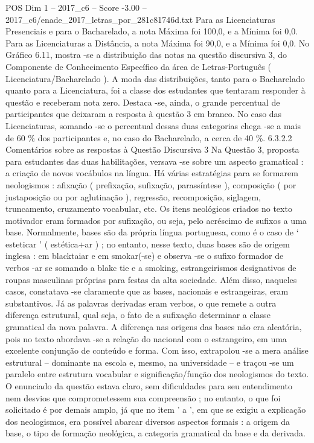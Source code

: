 \begin{textsample}{POS Dim 1 – 2017\_c6 – Score -3.00 – 2017\_c6/enade\_2017\_letras\_por\_281c81746d.txt}
Para as Licenciaturas Presenciais e para o Bacharelado, a nota Máxima foi 100,0, e a Mínima foi 0,0.
Para as Licenciaturas a Distância, a nota Máxima foi 90,0, e a Mínima foi 0,0.
No Gráfico 6.11, mostra -se a distribuição das notas na questão discursiva 3, do Componente de Conhecimento Específico da área de Letras-Português ( Licenciatura/Bacharelado ).
A moda das distribuições, tanto para o Bacharelado quanto para a Licenciatura, foi a classe dos estudantes que tentaram responder à questão e receberam nota zero.
Destaca -se, ainda, o grande percentual de participantes que deixaram a resposta à questão 3 em branco.
No caso das Licenciaturas, somando -se o percentual dessas duas categorias chega -se a mais de 60 \% dos participantes e, no caso do Bacharelado, a cerca de 40 \%. 6.3.2.2 Comentários sobre as respostas à Questão Discursiva 3 Na Questão 3, proposta para estudantes das duas habilitações, versava -se sobre um aspecto gramatical : a criação de novos vocábulos na língua.
Há várias estratégias para se formarem neologismos : afixação ( prefixação, sufixação, parassíntese ), composição ( por justaposição ou por aglutinação ), regressão, recomposição, siglagem, truncamento, cruzamento vocabular, etc.
Os itens neológicos criados no texto motivador eram formados por sufixação, ou seja, pelo acréscimo de sufixos a uma base.
Normalmente, bases são da própria língua portuguesa, como é o caso de ‘ esteticar ’ ( estética+ar ) ; no entanto, nesse texto, duas bases são de origem inglesa : em blacktaiar e em smokar(-se) e observa -se o sufixo formador de verbos -ar se somando a blakc tie e a smoking, estrangeirismos designativos de roupas masculinas próprias para festas da alta sociedade.
Além disso, naqueles casos, constatava -se claramente que as bases, nacionais e estrangeiras, eram substantivos.
Já as palavras derivadas eram verbos, o que remete a outra diferença estrutural, qual seja, o fato de a sufixação determinar a classe gramatical da nova palavra.
A diferença nas origens das bases não era aleatória, pois no texto abordava -se a relação do nacional com o estrangeiro, em uma excelente conjunção de conteúdo e forma.
Com isso, extrapolou -se a mera análise estrutural – dominante na escola e, mesmo, na universidade – e traçou -se um paralelo entre estrutura vocabular e significação/função dos neologismos do texto.
O enunciado da questão estava claro, sem dificuldades para seu entendimento nem desvios que comprometessem sua compreensão ; no entanto, o que foi solicitado é por demais amplo, já que no item ' a ', em que se exigiu a explicação dos neologismos, era possível abarcar diversos aspectos formais : a origem da base, o tipo de formação neológica, a categoria gramatical da base e da derivada.

\end{textsample}
